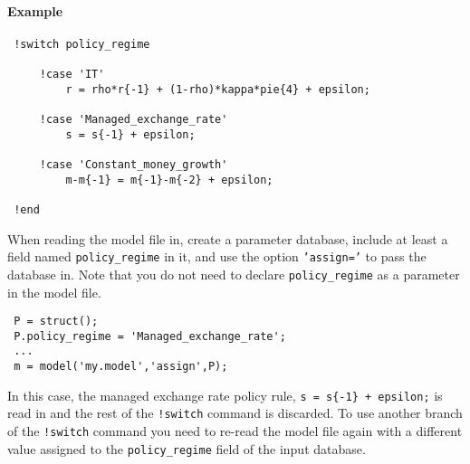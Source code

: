  \paragraph{Example}
 
 \begin{verbatim}
 !switch policy_regime
 
     !case 'IT'
         r = rho*r{-1} + (1-rho)*kappa*pie{4} + epsilon;
 
     !case 'Managed_exchange_rate'
         s = s{-1} + epsilon;
 
     !case 'Constant_money_growth'
         m-m{-1} = m{-1}-m{-2} + epsilon;
 
 !end
 \end{verbatim}
 
 When reading the model file in, create a parameter database, include at
 least a field named \texttt{policy\_regime} in it, and use the option
 \texttt{'assign='} to pass the database in. Note that you do not need to
 declare \texttt{policy\_regime} as a parameter in the model file.
 
 \begin{verbatim}
 P = struct();
 P.policy_regime = 'Managed_exchange_rate';
 ...
 m = model('my.model','assign',P);
 \end{verbatim}
 
 In this case, the managed exchange rate policy rule,
 \texttt{s = s\{-1\} + epsilon;} is read in and the rest of the
 \texttt{!switch} command is discarded. To use another branch of the
 \texttt{!switch} command you need to re-read the model file again with a
 different value assigned to the \texttt{policy\_regime} field of the
 input database.


